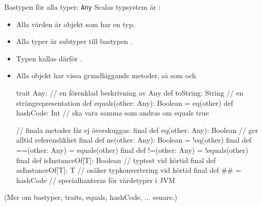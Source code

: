 


\begin{Slide}{Bastypen för alla typer: \texttt{Any}}
\SlideFontSmall
Scalas typsystem är :
\begin{itemize}\SlideFontSmall
  \item Alla värden är objekt som har en typ.
  \item Alla typer är subtyper till bastypen .
  \item Typen  kallas därför .
  \item Alla objekt har vissa grundläggande metoder, så som  och \code{==}
  \pause
\begin{Code}
trait Any:              // en förenklad beskrivning av Any
  def toString: String  // en strängrepresentation
  def equals(other: Any): Boolean = eq(other)
  def hashCode: Int     // ska vara samma som andras om equals true

  // finala metoder får ej överskuggas:
  final def eq(other: Any): Boolean  // ger alltid referenslikhet
  final def ne(other: Any): Boolean = !eq(other)
  final def ==(other: Any) = equals(other)
  final def !=(other: Any) = !equals(other)
  final def isInstanceOf[T]: Boolean  // typtest vid körtid
  final def asInstanceOf[T]: T  // osäker typkonvertering vid körtid
  final def ## = hashCode  // specialhanteras för värdetyper i JVM
\end{Code}
\end{itemize}

(Mer om bastyper, traits, equals, hashCode, ... senare.)
\end{Slide}

